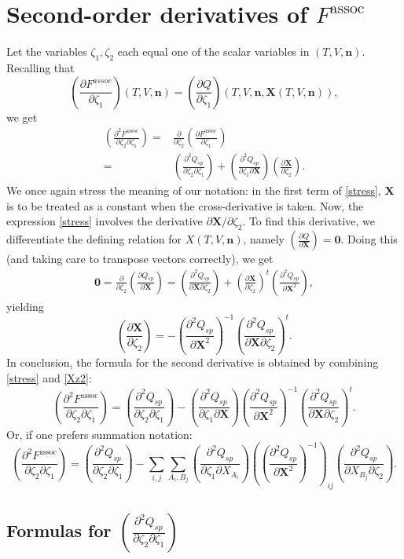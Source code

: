 \documentclass[english]{../thermomemo/thermomemo}
\newcommand{\mbf}[0]{\mathbf}
\newcommand*{\pder}[2]{\left(\frac{\partial #1}{\partial #2}\right)}
\newcommand*{\pdder}[2]{\left(\frac{\partial^2 #1}{\partial #2^2}\right)}
\newcommand*{\pdcross}[3]{\left(\frac{\partial^2 #1}{\partial #2 \partial #3}\right)}
\newcommand{\z}{\zeta}
\newcommand{\lp}{\left(}
\newcommand{\rp}{\right)}
\begin{document}
\section{Second-order derivatives of $F^{\text{assoc}}$}
Let the variables $\z_1,\z_2$ each equal one of the scalar variables in $(T,V,\mbf n)$. Recalling that 
$$
\pder{F^{assoc}}{\z_1}(T,V,\mbf n) = \pder{Q}{\z_1}(T,V,\mbf n,\mbf X(T,V,\mbf n)),
$$
we get
\begin{align}
  \pdcross{F^{\text{assoc}}}{\z_2}{\z_1} =& \frac{\partial}{\partial \z_2} \pder{F^{\text{assoc}}}{\z_1} \\
  =& \pdcross{Q_{sp}}{\z_2}{\z_1} + \pdcross{Q_{sp}}{\z_1}{\mbf X} \pder{\mbf X}{\z_2}. \label{stress}
\end{align}
We once again stress the meaning of our notation: in the first term of \eqref{stress}, $\mbf X$ is to be treated as a constant when the cross-derivative is taken. Now, the expression \eqref{stress} involves the derivative $\partial \mbf X/\partial \z_2$. To find this derivative, we differentiate the defining relation for $X(T,V,\mbf n)$, namely $\pder{Q}{\mbf X} = \mbf 0$. Doing this (and taking care to transpose vectors correctly), we get
\begin{align}
 \mbf 0 = \frac{\partial}{\partial \z_2} \pder{Q_{sp}}{\mbf X} = \pdcross{Q_{sp}}{\mbf X}{\z_2} + \pder{\mbf X}{\z_2}^t \pdder{Q_{sp}}{\mbf X},
\end{align}
yielding
\begin{equation}
  \label{Xz2}
  \pder{\mbf X}{\z_2} = - \pdder{Q_{sp}}{\mbf X}^{-1} \pdcross{Q_{sp}}{\mbf X}{\z_2}^t.
\end{equation}
In conclusion, the formula for the second derivative is obtained by combining \eqref{stress} and \eqref{Xz2}:
\begin{equation}
  \pdcross{F^{\text{assoc}}}{\z_2}{\z_1} = \pdcross{Q_{sp}}{\z_2}{\z_1} -  \pdcross{Q_{sp}}{\z_1}{\mbf X} \pdder{Q_{sp}}{\mbf X}^{-1} \pdcross{Q_{sp}}{\mbf X}{\z_2}^t.
\end{equation}
Or, if one prefers summation notation:
\begin{equation}
  \pdcross{F^{\text{assoc}}}{\z_2}{\z_1} = \pdcross{Q_{sp}}{\z_2}{\z_1} -  \sum_{i,j} \sum_{A_i,B_j} \pdcross{Q_{sp}}{\z_1}{X_{A_i}} \lp \pdder{Q_{sp}}{\mbf X}^{-1} \rp_{ij} \pdcross{Q_{sp}}{X_{B_j}}{\z_2}.
\end{equation}

\subsection{Formulas for $\pdcross{Q_{sp}}{\z_2}{\z_1}$}
\end{document}
